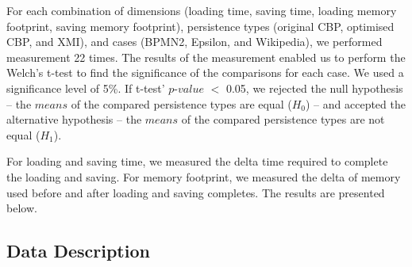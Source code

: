 \documentclass{llncs}
\begin{document}
    For each combination of dimensions (loading time, saving time, loading memory footprint, saving memory footprint),  persistence types (original CBP, optimised CBP, and XMI), and cases (BPMN2, Epsilon, and Wikipedia), we performed measurement 22 times. The results of the measurement enabled us to perform the Welch's t-test \cite{welch1947ttest} to find the significance of the comparisons for each case. We used a significance level of 5\%. If t-test' $p$-$value$ $<$ 0.05, we rejected the null hypothesis -- the $means$ of the compared persistence types are equal ($H_0$) -- and accepted the alternative hypothesis -- the $means$ of the compared persistence types are not equal ($H_1$).
    
     For loading and saving time, we measured the delta time required to complete the loading and saving. For memory footprint, we measured the delta of memory used before and after loading and saving completes. The results are presented below.

\vspace{-10pt}
\subsection{Data Description}
\label{subsec:data_description}
\end{document}
